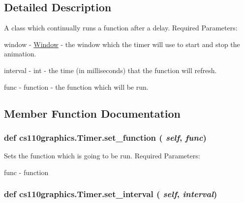 \subsection{Detailed Description}
A class which continually runs a function after a delay. Required Parameters:
\begin{DoxyItemize}
\item window -\/ \hyperlink{classcs110graphics_1_1Window}{Window} -\/ the window which the timer will use to start and stop the animation.
\item interval -\/ int -\/ the time (in milliseconds) that the function will refresh.
\item func -\/ function -\/ the function which will be run. 
\end{DoxyItemize}

\subsection{Member Function Documentation}
\hypertarget{classcs110graphics_1_1Timer_aba0aae9c8bfff7c626112f0020383a8d}{
\subsubsection[{set\_\-function}]{\setlength{\rightskip}{0pt plus 5cm}def cs110graphics.Timer.set\_\-function ( {\em self}, \/   {\em func})}}
\label{classcs110graphics_1_1Timer_aba0aae9c8bfff7c626112f0020383a8d}


Sets the function which is going to be run. Required Parameters:
\begin{DoxyItemize}
\item func -\/ function 
\end{DoxyItemize}\hypertarget{classcs110graphics_1_1Timer_ae176b030095b0d96fa0e91f2c398c40a}{
\subsubsection[{set\_\-interval}]{\setlength{\rightskip}{0pt plus 5cm}def cs110graphics.Timer.set\_\-interval ( {\em self}, \/   {\em interval})}}
\label{classcs110graphics_1_1Timer_ae176b030095b0d96fa0e91f2c398c40a}


